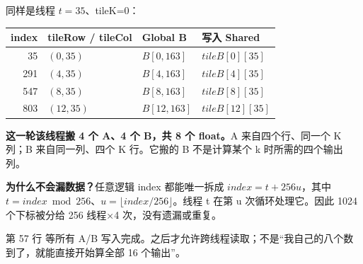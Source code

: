 同样是线程 $t=35$、tileK=0：
\begin{table}[H]\centering\small
\begin{tabular}{rlll}
\toprule
index & tileRow / tileCol & Global B & 写入 Shared\\\midrule
35 & $(0,35)$ & $B[0,163]$ & $tileB[0][35]$\\
291 & $(4,35)$ & $B[4,163]$ & $tileB[4][35]$\\
547 & $(8,35)$ & $B[8,163]$ & $tileB[8][35]$\\
803 & $(12,35)$ & $B[12,163]$ & $tileB[12][35]$\\\bottomrule
\end{tabular}
\end{table}
\textbf{这一轮该线程搬 4 个 A、4 个 B，共 8 个 float。}A 来自四个行、同一个 K 列；B 来自同一列、四个 K 行。它搬的 B 不是计算某个 k 时所需的四个输出列。

\textbf{为什么不会漏数据？}任意逻辑 index 都能唯一拆成 $index=t+256u$，其中 $t=index\bmod256$、$u=\lfloor index/256\rfloor$。线程 t 在第 u 次循环处理它。因此 1024 个下标被分给 256 线程×4 次，没有遗漏或重复。

第 57 行  等所有 A/B 写入完成。之后才允许跨线程读取；不是“我自己的八个数到了，就能直接开始算全部 16 个输出”。
\pagebreakhere

